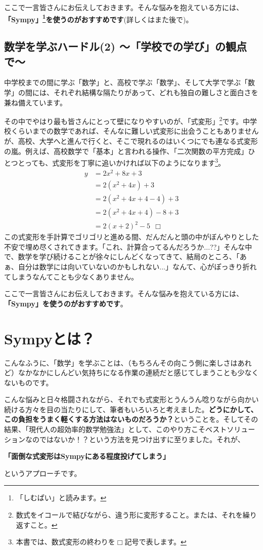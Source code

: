 \documentclass[12pt, a5paper]{jsbook}
\begin{document}
ここで一言皆さんにお伝えしておきます。そんな悩みを抱えている方には、{\bf 「Sympy」\footnote{「しむぱい」と読みます。}を使うのがおすすめです}(詳しくはまた後で)。

\subsection{数学を学ぶハードル(2) 〜「学校での学び」の観点で〜}
中学校までの間に学ぶ「数学」と、高校で学ぶ「数学」、そして大学で学ぶ「数学」の間には、それぞれ結構な隔たりがあって、どれも独自の難しさと面白さを兼ね備えています。

その中でやはり最も皆さんにとって壁になりやすいのが、「式変形」\footnote{数式をイコールで結びながら、違う形に変形すること。または、それを繰り返すこと。}です。中学校くらいまでの数学であれば、そんなに難しい式変形に出会うこともありませんが、高校、大学へと進んで行くと、そこで現れるのはいくつにでも連なる式変形の嵐。例えば、高校数学で「基本」と言われる操作、「二次関数の平方完成」ひとつとっても、式変形を丁寧に追いかければ以下のようになります\footnote{本書では、数式変形の終わりを$\Box$記号で表します。}。
\begin{align*}
    y &= 2x^2 + 8x + 3\\
    &= 2(x^2+4x)+3\\
    &= 2(x^2+4x+4-4)+3\\
    &= 2(x^2+4x+4)-8+3\\
    &= 2(x+2)^2-5\ \ \Box
\end{align*}
この式変形を手計算でゴリゴリと進める間、だんだんと頭の中がぼんやりとした不安で埋め尽くされてきます。「これ、計算合ってるんだろうか...??」そんな中で、数学を学び続けることが徐々にしんどくなってきて、結局のところ、「あぁ、自分は数学には向いていないのかもしれない...」なんて、心がぽっきり折れてしまうなんてことも少なくありません。

ここで一言皆さんにお伝えしておきます。そんな悩みを抱えている方には、{\bf 「Sympy」を使うのがおすすめです}。
\section{Sympyとは？}
こんなふうに、「数学」を学ぶことは、（もちろんその向こう側に楽しさはあれど）なかなかにしんどい気持ちになる作業の連続だと感じてしまうことも少なくないものです。

こんな悩みと日々格闘されながら、それでも式変形とうんうん唸りながら向かい続ける方々を目の当たりにして、筆者もいろいろと考えました。{\bf どうにかして、この負担をうまく軽くする方法はないものだろうか？}ということを。そしてその結果、「現代人の超効率的数学勉強法」として、このやり方こそベストソリューションなのではないか！？という方法を見つけ出すに至りました。それが、
\begin{center}
{\bf 「面倒な式変形はSympyにある程度投げてしまう」}
\end{center}
というアプローチです。
\end{document}
